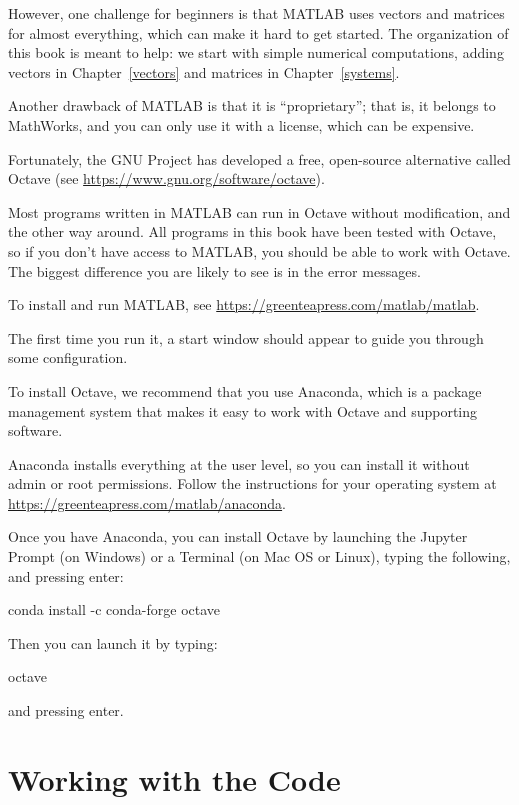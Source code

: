 However, one challenge for beginners is that MATLAB uses vectors and matrices for almost everything, which can make it hard to get started.  The organization of this book is meant to help: we start with simple numerical computations, adding vectors in Chapter~\ref{vectors} and matrices in Chapter~\ref{systems}.

Another drawback of MATLAB is that it is ``proprietary''; that is, it belongs to MathWorks, and you can only use it with a license, which can be expensive.

Fortunately, the GNU Project has developed a free, open-source alternative called Octave (see \url{https://www.gnu.org/software/octave}).  

Most programs written in MATLAB can run in Octave without modification, and the other way around.  All programs in this book have been tested with Octave, so if you don't have access to MATLAB, you should be able to work with Octave.  The biggest difference you are likely to see is in the error messages.

To install and run MATLAB, see \url{https://greenteapress.com/matlab/matlab}.

The first time you run it, a start window should appear to guide you through some configuration.

To install Octave, we recommend that you use Anaconda, which is a package management system that makes it easy to work with Octave and supporting software.

Anaconda installs everything at the user level, so you can install it without admin or root permissions.  Follow the instructions for your operating system at \url{https://greenteapress.com/matlab/anaconda}.

Once you have Anaconda, you can install Octave by launching the Jupyter Prompt (on Windows) or a Terminal (on Mac OS or Linux), typing the following, and pressing \textsf{enter}:

\begin{code}
conda install -c conda-forge octave
\end{code}

Then you can launch it by typing:

\begin{code}
octave
\end{code}

and pressing \textsf{enter}.

\section{Working with the Code}

